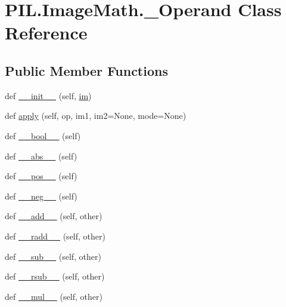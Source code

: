 \hypertarget{classPIL_1_1ImageMath_1_1__Operand}{}\section{P\+I\+L.\+Image\+Math.\+\_\+\+Operand Class Reference}
\label{classPIL_1_1ImageMath_1_1__Operand}
\subsection*{Public Member Functions}
\begin{DoxyCompactItemize}
\item 
def \hyperlink{classPIL_1_1ImageMath_1_1__Operand_ab20750e1b6cfe98ca715cc67f0209b0a}{\+\_\+\+\_\+init\+\_\+\+\_\+} (self, \hyperlink{classPIL_1_1ImageMath_1_1__Operand_a2ce3cb32228ab976e70061bd3b94f1e0}{im})
\item 
def \hyperlink{classPIL_1_1ImageMath_1_1__Operand_a76bbb5abb1f482d986c62a112f9b5d8c}{apply} (self, op, im1, im2=None, mode=None)
\item 
def \hyperlink{classPIL_1_1ImageMath_1_1__Operand_a6519e843d2c7f6af3041f59346daba46}{\+\_\+\+\_\+bool\+\_\+\+\_\+} (self)
\item 
def \hyperlink{classPIL_1_1ImageMath_1_1__Operand_a5ebf2a1f8305eb94cd0acbfb1de553bf}{\+\_\+\+\_\+abs\+\_\+\+\_\+} (self)
\item 
def \hyperlink{classPIL_1_1ImageMath_1_1__Operand_adc10f3286c93af4ee90909bdc2cd9e1e}{\+\_\+\+\_\+pos\+\_\+\+\_\+} (self)
\item 
def \hyperlink{classPIL_1_1ImageMath_1_1__Operand_a51ba18767b2583c493f61d5d20ba8e6f}{\+\_\+\+\_\+neg\+\_\+\+\_\+} (self)
\item 
def \hyperlink{classPIL_1_1ImageMath_1_1__Operand_afe6168ed3ca077dd339dbfa6c9d9d988}{\+\_\+\+\_\+add\+\_\+\+\_\+} (self, other)
\item 
def \hyperlink{classPIL_1_1ImageMath_1_1__Operand_a880aedc24f385f1ab44d69abf8617c35}{\+\_\+\+\_\+radd\+\_\+\+\_\+} (self, other)
\item 
def \hyperlink{classPIL_1_1ImageMath_1_1__Operand_aeba9c3a05da54ca9aee80de61c6fbb0e}{\+\_\+\+\_\+sub\+\_\+\+\_\+} (self, other)
\item 
def \hyperlink{classPIL_1_1ImageMath_1_1__Operand_acd0b4c1a6c36547c5d14cf27439e2f50}{\+\_\+\+\_\+rsub\+\_\+\+\_\+} (self, other)
\item 
def \hyperlink{classPIL_1_1ImageMath_1_1__Operand_a3cb541f46049554126b21a6f60d72a05}{\+\_\+\+\_\+mul\+\_\+\+\_\+} (self, other)

\end{DoxyCompactItemize}
